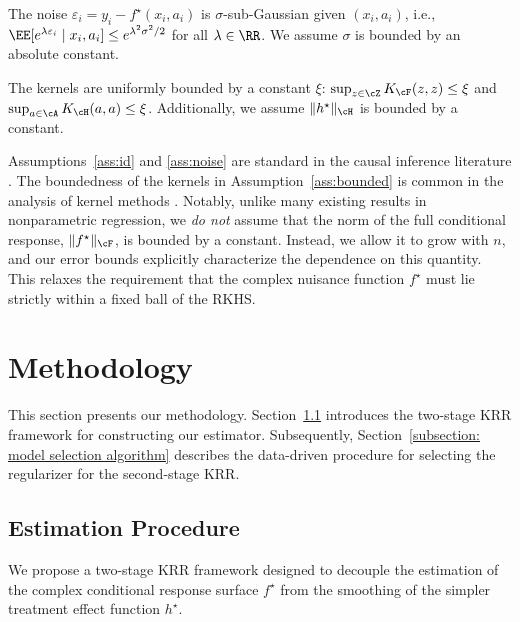 \documentclass[english,11pt]{article}
\begin{document}
\begin{assumption}\label{ass:noise}
    The noise $\varepsilon_i = y_i - f^\star(x_i, a_i)$ is $\sigma$-sub-Gaussian given $(x_i, a_i)$, i.e., $\EE[e^{\lambda \varepsilon_i} \mid x_i, a_i] \le e^{\lambda^2 \sigma^2 / 2}$ for all $\lambda \in \RR$.
    We assume $\sigma$ is bounded by an absolute constant.
\end{assumption}

\begin{assumption}[Boundedness]\label{ass:bounded}
    The kernels are uniformly bounded by a constant $\xi$: $\sup_{z \in \cZ} K_\cF(z, z) \le \xi$ and $\sup_{a \in \cA} K_\cH(a, a) \le \xi$. Additionally, we assume $\|h^\star\|_\cH$ is bounded by a constant.
\end{assumption}

Assumptions~\ref{ass:id} and \ref{ass:noise} are standard in the causal inference literature \citep{bonvini2022fast,kennedy2017non,kunzel2019metalearners,curth2021nonparametric}.
The boundedness of the kernels in Assumption~\ref{ass:bounded} is common in the analysis of kernel methods \citep{wainwright2019high,singh2024kernel}. Notably, unlike many existing results in nonparametric regression, we \emph{do not} assume that the norm of the full conditional response, $\|f^\star\|_\cF$, is bounded by a constant. Instead, we allow it to grow with $n$, and our error bounds explicitly characterize the dependence on this quantity. This relaxes the requirement that the complex nuisance function $f^\star$ must lie strictly within a fixed ball of the RKHS.

\section{Methodology}\label{section: methodology}

This section presents our methodology.
Section~\ref{subsection: estimation algorithm} introduces the two-stage KRR framework for constructing our estimator.
Subsequently, Section~\ref{subsection: model selection algorithm} describes the data-driven procedure for selecting the regularizer for the second-stage KRR.

\subsection{Estimation Procedure}\label{subsection: estimation algorithm}

We propose a two-stage KRR framework designed to decouple the estimation of the complex conditional response surface $f^\star$ from the smoothing of the simpler treatment effect function $h^\star$.
\end{document}
